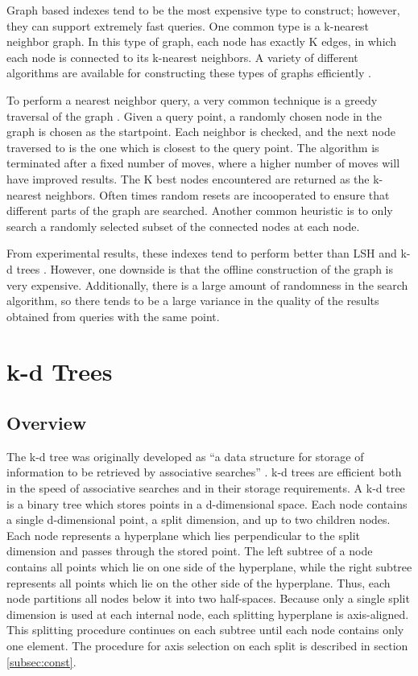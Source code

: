 Graph based indexes tend to be the most expensive type to construct; however, they can support extremely fast queries.  One common type is a k-nearest neighbor graph.  In this type of graph, each node has exactly K edges, in which each node is connected to its k-nearest neighbors.  A variety of different algorithms are available for constructing these types of graphs efficiently \citep{connor2010fast}.

To perform a nearest neighbor query, a very common technique is a greedy traversal of the graph \citep{hajebi2011fast}.  Given a query point, a randomly chosen node in the graph is chosen as the startpoint.  Each neighbor is checked, and the next node traversed to is the one which is closest to the query point.  The algorithm is terminated after a fixed number of moves, where a higher number of moves will have improved results.  The K best nodes encountered are returned as the k-nearest neighbors.  Often times random resets are incooperated to ensure that different parts of the graph are searched.  Another common heuristic is to only search a randomly selected subset of the connected nodes at each node.

From experimental results, these indexes tend to perform better than LSH and k-d trees \citep{hajebi2011fast}.  However, one downside is that the offline construction of the graph is very expensive.  Additionally, there is a large amount of randomness in the search algorithm, so there tends to be a large variance in the quality of the results obtained from queries with the same point.

\section{k-d Trees}
\label{sec:kdtree}

\subsection{Overview}
The k-d tree was originally developed as ``a data structure for storage of information to be retrieved by associative searches'' \citep{bentley1975multidimensional}. k-d trees are efficient both in the speed of associative searches and in their storage requirements.  A k-d tree is a binary tree which stores points in a d-dimensional space.  Each node contains a single d-dimensional point, a split dimension, and up to two children nodes.  Each node represents a hyperplane which lies perpendicular to the split dimension and passes through the stored point.  The left subtree of a node contains all points which lie on one side of the hyperplane, while the right subtree represents all points which lie on the other side of the hyperplane.  Thus, each node partitions all nodes below it into two half-spaces.  Because only a single split dimension is used at each internal node, each splitting hyperplane is axis-aligned.  This splitting procedure continues on each subtree until each node contains only one element.  The procedure for axis selection on each split is described in section \ref{subsec:const}.

